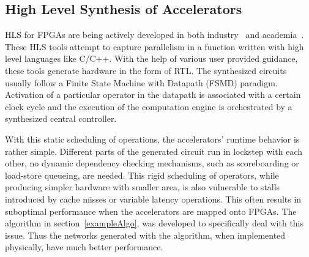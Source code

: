 \documentclass{sig-alternate}
\begin{document}
\subsection{High Level Synthesis of Accelerators}
\label{pre2}
HLS for FPGAs are being actively developed in both industry~\cite{tools:vivadohls} and academia~\cite{tools:legup}.
These HLS tools attempt to capture parallelism in a function written with high level languages like C/C++. With the help of various user provided guidance, these tools generate hardware in the form of RTL. 
The synthesized circuits usually follow a Finite State Machine with Datapath (FSMD) paradigm. Activation of a particular operator in the datapath is associated
with a certain clock cycle and the execution of the computation engine is orchestrated by a synthesized central controller. 

With this static scheduling of operations, the accelerators' runtime behavior is rather simple. Different parts
of the generated circuit run in lockstep with each other, no dynamic dependency checking mechanisms,
such as scoreboarding or load-store queueing, are needed.
This rigid scheduling of operators, while producing simpler hardware with smaller area,
is also vulnerable to stalls introduced by cache misses or variable latency operations.
This often results in suboptimal performance when the accelerators
are mapped onto FPGAs. The algorithm in section~\ref{exampleAlgo}, was developed to
specifically deal with this issue. Thus the networks generated with the algorithm, when implemented physically, have much better performance. 

\end{document}
